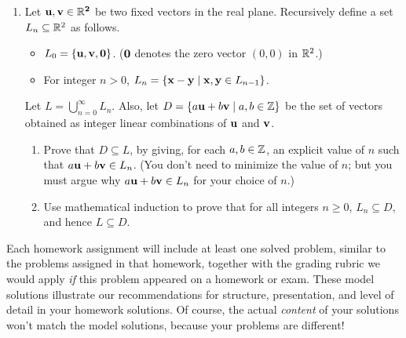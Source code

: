 \documentclass[11pt]{article}
\begin{document}
\begin{enumerate}
\newcommand{\bu}{\bf u}
\newcommand{\bv}{\bf v}
\item Let $\bu,\bv \in \R^2$ be two fixed vectors in the real plane.
Recursively define a set $L_n \subseteq \R^2$
as follows.
\begin{itemize}
\item $L_0 = \{\bu,\bv,{\bf 0}\}$. (${\bf 0}$ denotes the zero vector 
$(0,0)$ in $\R^2$.)
\item For integer $n > 0$, $L_n = \{ {\bf x}- {\bf y} \mid {\bf x}, {\bf y}
  \in L_{n-1} \}$.
\end{itemize}
Let $L = \bigcup_{n=0}^\infty L_n$. Also, let $D = \{ a{\bf u}+b{\bf
  v} \mid a,b \in \Z \}$ be the set of vectors obtained as integer
linear combinations of ${\bf u}$ and ${\bf v}$.
\begin{enumerate}
\item Prove that $D \subseteq L$, by giving, for each $a,b\in\Z$,
an explicit value of $n$ such that $a{\bf u}+b{\bf v}\in L_n$. 
(You don't need to
minimize the value of $n$; but you must argue why $a{\bf u}+b{\bf v} \in L_n$ for your
choice of $n$.)
\item Use mathematical induction to prove that for all integers $n\ge 0$,
$L_n \subseteq D$, and hence $L \subseteq D$.
\end{enumerate}



\end{enumerate}


\newpage

\begin{boxquote}{0.95}
Each homework assignment will include at least one solved problem, similar to the problems assigned in that homework, together with the grading rubric we would apply \emph{if} this problem appeared on a homework or exam.  These model solutions illustrate our recommendations for structure, presentation, and level of detail in your homework solutions.  Of course, the actual \emph{content} of your solutions won’t match the model solutions, because your problems are different!
\end{boxquote}
\end{document}
